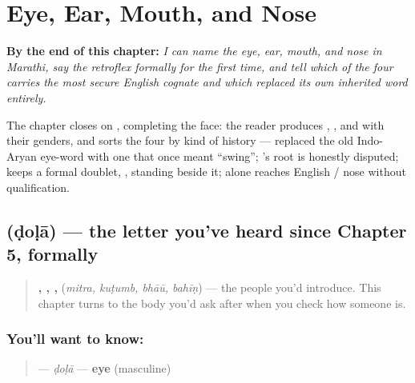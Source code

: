 
\chapter{Eye, Ear, Mouth, and Nose}
\label{ch:mr-face-parts}

\begin{chapteropening}
\textbf{By the end of this chapter:} \emph{I can name the eye, ear, mouth, and nose in Marathi, say the retroflex  formally for the first time, and tell which of the four carries the most secure English cognate and which replaced its own inherited word entirely.}

The chapter closes on , completing the face: the reader produces , ,  and  with their genders, and sorts the four by kind of history —  replaced the old Indo-Aryan eye-word with one that once meant \textquotedblleft{}swing\textquotedblright{}; 's root is honestly disputed;  keeps a formal doublet, , standing beside it;  alone reaches English  / nose without qualification.
\end{chapteropening}

\section[ḍoḷā]{ (ḍoḷā) — the letter you've heard since Chapter 5, formally}

\label{lesson:MR-C12-dola}



\begin{quote}
\textbf{, , , } (\emph{mitra, kuṭumb, bhāū, bahīṇ}) — the people you'd introduce. This chapter turns to the body you'd ask after when you check how someone is.
\end{quote}

\subsection*{You'll want to know: }
\begin{quote}
\textbf{} — \emph{ḍoḷā} — \textbf{eye} (masculine)
\end{quote}

